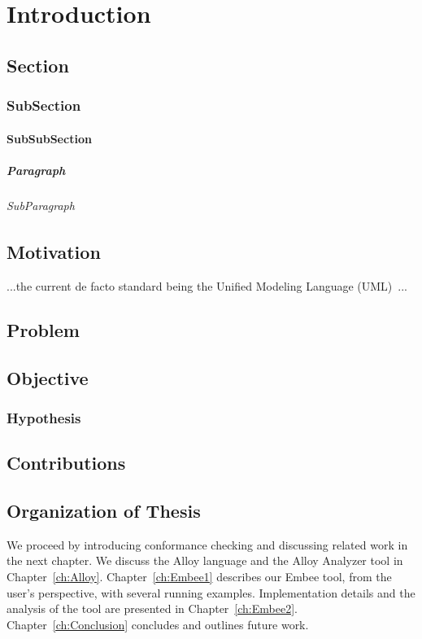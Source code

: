 \chapter{Introduction}

\section{Section}
\subsection{SubSection}
\subsubsection{SubSubSection}
\paragraph{Paragraph}
\subparagraph{SubParagraph}

\section{Motivation}

...the current de facto standard being the Unified Modeling Language
(UML)~\cite{BRJ99}...

\section{Problem}

\section{Objective}



\subsection{Hypothesis}


\section{Contributions}


\section{Organization of Thesis}

We proceed by introducing conformance checking and discussing related work in the next
chapter. We discuss the Alloy language and the Alloy Analyzer tool in
Chapter~\ref{ch:Alloy}.  Chapter~\ref{ch:Embee1} describes our Embee tool, from the
user's perspective, with several running examples.  Implementation details and the
analysis of the tool are presented in Chapter~\ref{ch:Embee2}.
Chapter~\ref{ch:Conclusion} concludes and outlines future work.
